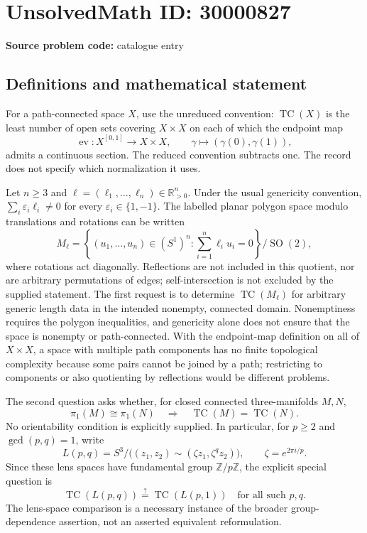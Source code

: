 \documentclass[11pt]{article}
\newcommand{\Z}{\mathbb{Z}}
\newcommand{\R}{\mathbb{R}}
\begin{document}
\section*{UnsolvedMath ID: 30000827}
\textbf{Source problem code:} catalogue entry
\subsection{Definitions and mathematical statement}
For a path-connected space \(X\), use the unreduced convention: \(\operatorname{TC}(X)\) is the least number of open sets covering \(X\times X\) on each of which the endpoint map
\[
 \operatorname{ev}:X^{[0,1]}\to X\times X,\qquad
 \gamma\mapsto(\gamma(0),\gamma(1)),
\]
admits a continuous section. The reduced convention subtracts one. The record does not specify which normalization it uses.

Let \(n\geq3\) and \(\ell=(\ell_1,\ldots,\ell_n)\in\R_{>0}^n\). Under the usual genericity convention, \(\sum_i\varepsilon_i\ell_i\ne0\) for every \(\varepsilon_i\in\{1,-1\}\). The labelled planar polygon space modulo translations and rotations can be written
\[
 M_\ell=\left\{(u_1,\ldots,u_n)\in(S^1)^n:
                  \sum_{i=1}^n\ell_i u_i=0\right\}/\operatorname{SO}(2),
\]
where rotations act diagonally. Reflections are not included in this quotient, nor are arbitrary permutations of edges; self-intersection is not excluded by the supplied statement. The first request is to determine \(\operatorname{TC}(M_\ell)\) for arbitrary generic length data in the intended nonempty, connected domain. Nonemptiness requires the polygon inequalities, and genericity alone does not ensure that the space is nonempty or path-connected. With the endpoint-map definition on all of \(X\times X\), a space with multiple path components has no finite topological complexity because some pairs cannot be joined by a path; restricting to components or also quotienting by reflections would be different problems.

The second question asks whether, for closed connected three-manifolds \(M,N\),
\[
 \pi_1(M)\cong\pi_1(N)\quad\Longrightarrow\quad
 \operatorname{TC}(M)=\operatorname{TC}(N).
\]
No orientability condition is explicitly supplied. In particular, for \(p\geq2\) and \(\gcd(p,q)=1\), write
\[
 L(p,q)=S^3/\bigl((z_1,z_2)\sim(\zeta z_1,\zeta^qz_2)\bigr),
 \qquad \zeta=e^{2\pi i/p}.
\]
Since these lens spaces have fundamental group \(\Z/p\Z\), the explicit special question is
\[
 \operatorname{TC}(L(p,q))\stackrel{?}{=}\operatorname{TC}(L(p,1))
 \quad\text{for all such }p,q.
\]
The lens-space comparison is a necessary instance of the broader group-dependence assertion, not an asserted equivalent reformulation.
\end{document}
